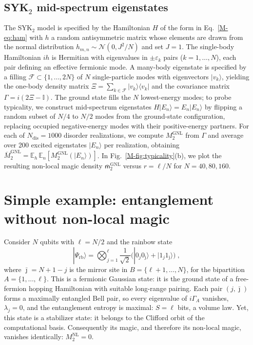 \documentclass[aps,prl,twocolumn,superscriptaddress,reprint,longbibliography,nofootinbib]{revtex4-2}
\begin{document}
\subsection{SYK$_2$ mid-spectrum eigenstates}
\label{app:syk}
The SYK$_2$ model is specified by the Hamiltonian  $H$ of the form in  Eq.~\eqref{M-eq:ham} with  $h$ a random antisymmetric matrix whose elements are drawn from the normal distribution $h_{m,n}\sim \mathcal{N}(0,{J^2}/{N})$ and set $J=1$. 
The single-body Hamiltonian $ih$ is Hermitian with eigenvalues in $\pm\varepsilon_k$ pairs ($k=1,\dots,N$), each pair defining an effective fermionic mode. A many-body eigenstate is specified by a filling $\mathcal{F}\subset\{1,\dots,2N\}$ of $N$ single-particle modes with eigenvectors $|v_k\rangle$, yielding the one-body density matrix $\Xi=\sum_{k\in\mathcal{F}}|v_k\rangle\langle v_k|$ and the covariance matrix $\Gamma = i(2\Xi-\mathbb{I})$. 
The ground state fills the $N$ lowest-energy modes; to probe typicality, we construct mid-spectrum eigenstates $H|E_n\rangle=E_n|E_n\rangle$  by flipping a random subset of $N/4$ to $N/2$ modes from the ground-state configuration, replacing occupied negative-energy modes with their positive-energy partners. For each of $N_{\mathrm{dis}}=1000$ disorder realizations, we compute $M_2^{\mathrm{GNL}}$ from $\Gamma$ and average over 200 excited eigenstates $|E_n\rangle$ per realization, obtaining $\overline{M}_2^{\mathrm{GNL}}=\mathbb{E}_{h}\,\mathbb{E}_{n}[M_2^{\mathrm{GNL}}(|E_n\rangle)]$.
In Fig.~\ref{M-fig:typicality}(b), we plot the resulting non-local magic density $\overline{\mathsf{m}}_2^\mathrm{GNL}$ versus $r=\ell/N$ for $N=40,80,160$.


\section{Simple example: entanglement without non-local magic}
\label{app:rainbow}
Consider $N$ qubits with $\ell = N/2$ and the rainbow state
\begin{equation}
    |\Psi_{\mathrm{rb}}\rangle = \bigotimes_{j=1}^{\ell} \frac{1}{\sqrt{2}}\bigl(|0_j 0_{\bar\jmath}\rangle + |1_j 1_{\bar\jmath}\rangle\bigr)\;,
\end{equation}
where $\bar\jmath = N+1-j$ is the mirror site in $B=\{\ell+1,\dots,N\}$, for the bipartition $A=\{1,\dots,\ell\}$. This is a fermionic Gaussian state: it is the ground state of a free-fermion hopping Hamiltonian with suitable long-range pairing. Each pair $(j,\bar\jmath)$ forms a maximally entangled Bell pair, so every eigenvalue of $i\Gamma_A$ vanishes, $\lambda_j = 0$, and the entanglement entropy is maximal: $S = \ell$ bits, a volume law. Yet, this state is a stabilizer state: it belongs to the Clifford orbit of the computational basis. Consequently its magic, and therefore its non-local magic, vanishes identically: $M_2^{\mathrm{NL}} = 0$.
\end{document}
